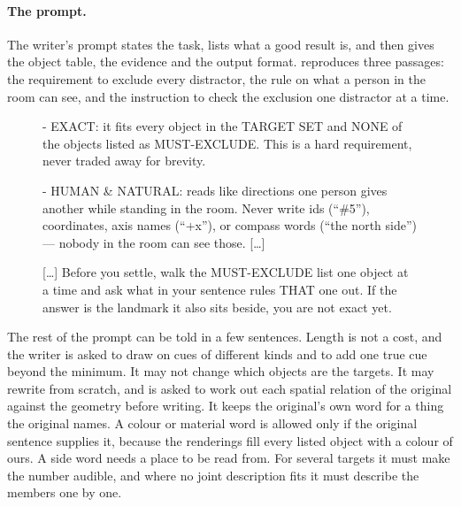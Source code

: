 \paragraph{The prompt.}
The writer's prompt states the task, lists what a good result is, and then gives the object table, the evidence and the output format.
 reproduces three passages: the requirement to exclude every distractor, the rule on what a person in the room can see, and the instruction to check the exclusion one distractor at a time.
\begin{figure}[t]
\begin{promptframe}
- EXACT: it fits every object in the TARGET SET and NONE of the objects listed as MUST-EXCLUDE. This is a hard requirement, never traded away for brevity.

- HUMAN \& NATURAL: reads like directions one person gives another while standing in the room. Never write ids (``\#5''), coordinates, axis names (``+x''), or compass words (``the north side'') --- nobody in the room can see those. [\ldots]

[\ldots] Before you settle, walk the MUST-EXCLUDE list one object at a time and ask what in your sentence rules THAT one out. If the answer is the landmark it also sits beside, you are not exact yet.
\end{promptframe}
\end{figure}
The rest of the prompt can be told in a few sentences.
Length is not a cost, and the writer is asked to draw on cues of different kinds and to add one true cue beyond the minimum.
It may not change which objects are the targets.
It may rewrite from scratch, and is asked to work out each spatial relation of the original against the geometry before writing.
It keeps the original's own word for a thing the original names.
A colour or material word is allowed only if the original sentence supplies it, because the renderings fill every listed object with a colour of ours.
A side word needs a place to be read from.
For several targets it must make the number audible, and where no joint description fits it must describe the members one by one.

